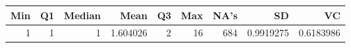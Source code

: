 
\begin{tabular}[t]{rrrrrrrrr}
\toprule
Min & Q1 & Median & Mean & Q3 & Max & NA's & SD & VC\\
\midrule
1 & 1 & 1 & 1.604026 & 2 & 16 & 684 & 0.9919275 & 0.6183986\\
\bottomrule
\end{tabular}